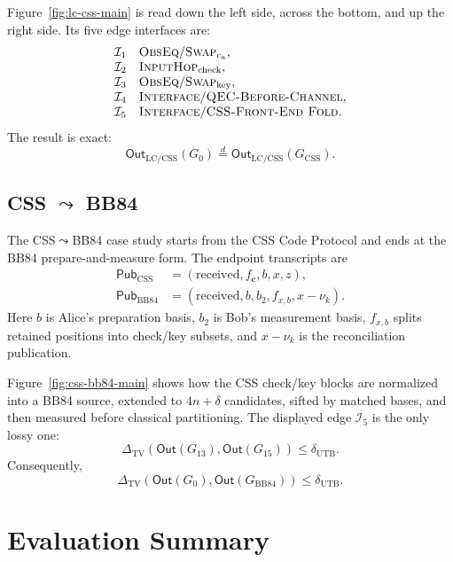 Figure~\ref{fig:lc-css-main} is read down the left side, across the bottom, and up the right side. Its five edge interfaces are:
\[
\begin{array}{@{}ll@{}}
\mathcal I_1 & \textsc{ObsEq}/\textsc{Swap}_{c_a},\\
\mathcal I_2 & \textsc{InputHop}_{\mathrm{check}},\\
\mathcal I_3 & \textsc{ObsEq}/\textsc{Swap}_{\mathrm{key}},\\
\mathcal I_4 & \textsc{Interface}/\textsc{QEC-Before-Channel},\\
\mathcal I_5 & \textsc{Interface}/\textsc{CSS-Front-End Fold}.
\end{array}
\]
The result is exact:
\[
\mathsf{Out}_{\mathrm{LC/CSS}}(G_0)\overset{d}{=}
\mathsf{Out}_{\mathrm{LC/CSS}}(G_{\mathrm{CSS}}).
\]

\subsection{\texorpdfstring{CSS $\leadsto$ BB84}{CSS to BB84}}

The CSS$\leadsto$BB84 case study starts from the CSS Code Protocol and ends at the BB84 prepare-and-measure form. The endpoint transcripts are
\[
\begin{aligned}
\mathsf{Pub}_{\mathrm{CSS}}
  &=(\mathrm{received},f_{\mathbf c},b,x,z),\\
\mathsf{Pub}_{\mathrm{BB84}}
  &=(\mathrm{received},b,b_2,f_{x,b},x-\nu_k).
\end{aligned}
\]
Here $b$ is Alice's preparation basis, $b_2$ is Bob's measurement basis, $f_{x,b}$ splits retained positions into check/key subsets, and $x-\nu_k$ is the reconciliation publication.

Figure~\ref{fig:css-bb84-main} shows how the CSS check/key blocks are normalized into a BB84 source, extended to $4n+\delta$ candidates, sifted by matched bases, and then measured before classical partitioning. The displayed edge $\mathcal I_5$ is the only lossy one:
\[
\Delta_{\mathrm{TV}}\!\left(
\mathsf{Out}(G_{13}),\mathsf{Out}(G_{15})
\right)\le \delta_{\mathrm{UTB}}.
\]
Consequently,
\[
\Delta_{\mathrm{TV}}\!\left(
\mathsf{Out}(G_0),\mathsf{Out}(G_{\mathrm{BB84}})
\right)\le \delta_{\mathrm{UTB}}.
\]



\section{Evaluation Summary}


